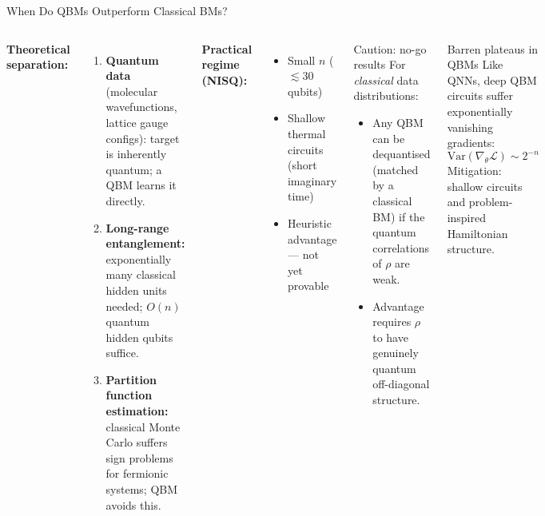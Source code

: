\documentclass[aspectratio=169,10pt]{beamer}
\begin{document}
\begin{frame}{When Do QBMs Outperform Classical BMs?}
  \begin{columns}[T]
      \textbf{Theoretical separation:}
      \begin{enumerate}\itemsep2pt
        \item \textbf{Quantum data} (molecular wavefunctions,
              lattice gauge configs): target is inherently
              quantum; a QBM learns it directly.
        \item \textbf{Long-range entanglement:}
              exponentially many classical hidden units needed;
              $O(n)$ quantum hidden qubits suffice.
        \item \textbf{Partition function estimation:}
              classical Monte Carlo suffers sign problems for
              fermionic systems; QBM avoids this.
      \end{enumerate}

      \textbf{Practical regime (NISQ):}
      \begin{itemize}\itemsep1pt
        \item Small $n$ ($\lesssim 30$ qubits)
        \item Shallow thermal circuits (short imaginary time)
        \item Heuristic advantage — not yet provable
      \end{itemize}
      \begin{alertblock}{Caution: no-go results}
        For \emph{classical} data distributions:
        \begin{itemize}\itemsep1pt
          \item Any QBM can be dequantised
                (matched by a classical BM) if the
                quantum correlations of $\rho$ are weak.
          \item Advantage requires $\rho$ to have
                genuinely quantum off-diagonal structure.
        \end{itemize}
      \end{alertblock}
      \vspace{0.15cm}
      \begin{block}{Barren plateaus in QBMs}
        Like QNNs, deep QBM circuits suffer exponentially
        vanishing gradients:
        \[
          \mathrm{Var}\!\left(\nabla_\theta\mathcal{L}\right)
          \sim 2^{-n}
        \]
        Mitigation: shallow circuits and problem-inspired
        Hamiltonian structure.
      \end{block}
  \end{columns}
\end{frame}
\end{document}
